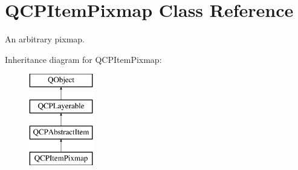 \hypertarget{classQCPItemPixmap}{}\section{Q\+C\+P\+Item\+Pixmap Class Reference}
\label{classQCPItemPixmap}


An arbitrary pixmap.  


Inheritance diagram for Q\+C\+P\+Item\+Pixmap\+:\begin{figure}[H]
\begin{center}
\leavevmode
\includegraphics[height=4.000000cm]{classQCPItemPixmap}
\end{center}
\end{figure}
